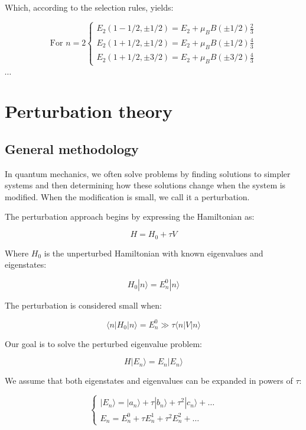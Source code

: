 \documentclass[italian]{HKNdocument}
\begin{document}
Which, according to the selection rules, yields:

\[
\text{For } n=2\left\{\begin{array}{l}
E_2(1-1/2,\pm 1/2)=E_2+\mu_B B(\pm 1/2)\frac{2}{3} \label{eq:12.59}\\
E_2(1+1/2,\pm 1/2)=E_2+\mu_B B(\pm 1/2)\frac{4}{3}\\
E_2(1+1/2,\pm 3/2)=E_2+\mu_B B(\pm 3/2)\frac{4}{3}
\end{array}\right.
\]

$\cdots$

\section{Perturbation theory}
\subsection{General methodology}
In quantum mechanics, we often solve problems by finding solutions to simpler systems and then determining how these solutions change when the system is modified. When the modification is small, we call it a perturbation.


The perturbation approach begins by expressing the Hamiltonian as:

\begin{equation}
H=H_0+\tau V \label{eq:13.1}
\end{equation}

Where $H_0$ is the unperturbed Hamiltonian with known eigenvalues and eigenstates:

\begin{equation}
H_0|n\rangle=E_n^0|n\rangle \label{eq:13.2}
\end{equation}

The perturbation is considered small when:

\begin{equation}
\langle n|H_0|n\rangle=E_n^0 \gg \tau\langle n|V|n\rangle \label{eq:13.3}
\end{equation}

Our goal is to solve the perturbed eigenvalue problem:

\begin{equation}
H|E_n\rangle=E_n|E_n\rangle \label{eq:13.4}
\end{equation}

We assume that both eigenstates and eigenvalues can be expanded in powers of $\tau$:

\[
\left\{\begin{array}{l}
|E_n\rangle=|a_n\rangle+\tau|b_n\rangle+\tau^2|c_n\rangle+\ldots \label{eq:13.5}\\
E_n=E_n^0+\tau E_n^1+\tau^2 E_n^2+\ldots
\end{array}\right.
\]
\end{document}
